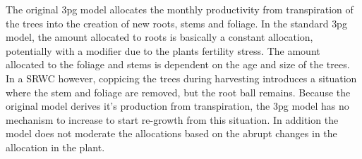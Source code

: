 \documentclass[10pt]{article}
\begin{document}
The original \ac{3pg} model allocates the monthly productivity from
transpiration of the trees into the creation of new roots, stems and
foliage.  In the standard \ac{3pg} model, the amount allocated to
roots is basically a constant allocation, potentially with a modifier
due to the plants fertility stress. The amount allocated to the
foliage and stems is dependent on the age and size of the trees.  In a
\ac{SRWC} however, coppicing the trees during harvesting introduces a
situation where the stem and foliage are removed, but the root ball
remains.  Because the original model derives it's production from
transpiration, the \ac{3pg} model has no mechanism to increase to
start re-growth from this situation.  In addition the model does not
moderate the allocations based on the abrupt changes in the allocation
in the plant.
\end{document}
